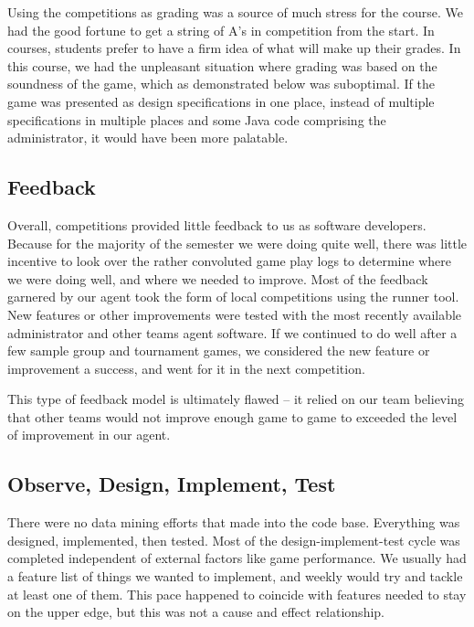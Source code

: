 \documentclass[letterpaper,12pt,oneside]{article}
\begin{document}
Using the competitions as grading was a source of much stress for the course.
We had the good fortune to get a string of A's in competition from the start.
In courses, students prefer to have a firm idea of what will make up their
grades. In this course, we had the unpleasant situation where grading was based
on the soundness of the game, which as demonstrated below was suboptimal. If
the game was presented as design specifications in one place, instead of
multiple specifications in multiple places and some Java code comprising the
administrator, it would have been more palatable.

\subsection{Feedback}
Overall, competitions provided little feedback to us as software developers.
Because for the majority of the semester we were doing quite well, there was
little incentive to look over the rather convoluted game play logs to
determine where we were doing well, and where we needed to improve. Most of the
feedback garnered by our agent took the form of local competitions using the
runner tool. New features or other improvements were tested with the most
recently available administrator and other teams agent software. If we
continued to do well after a few sample group and tournament games, we
considered the new feature or improvement a success, and went for it in the
next competition.

This type of feedback model is ultimately flawed -- it relied on our team
believing that other teams would not improve enough game to game to exceeded
the level of improvement in our agent. 

\subsection{Observe, Design, Implement, Test}
There were no data mining efforts that made into the code base. Everything
was designed, implemented, then tested. Most of the design-implement-test cycle
was completed independent of external factors like game performance. We usually
had a feature list of things we wanted to implement, and weekly would try and
tackle at least one of them. This pace happened to coincide with features
needed to stay on the upper edge, but this was not a cause and effect
relationship.
\end{document}
